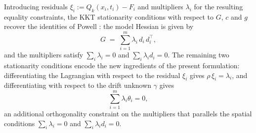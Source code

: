 \documentclass[11pt,a4paper]{article}
\begin{document}
Introducing residuals $\xi_i := Q_k(x_i, t_i) - F_i$ and multipliers
$\lambda_i$ for the resulting equality constraints, the KKT
stationarity conditions with respect to $G$, $c$ and $g$ recover the
identities of Powell \cite{Powell2004LeastFrobenius}: the model
Hessian is given by
\begin{equation}\label{eq:stat-G}
  G \;=\; \sum_{i=1}^m \lambda_i\,d_i\,d_i^{\!\top},
\end{equation}
and the multipliers satisfy $\sum_i \lambda_i = 0$ and
$\sum_i \lambda_i d_i = 0$. The remaining two stationarity conditions
encode the new ingredients of the present formulation: differentiating
the Lagrangian with respect to the residual $\xi_i$ gives
$\rho\,\xi_i = \lambda_i$, and differentiating with respect to the
drift unknown $\gamma$ gives
\begin{equation}\label{eq:stat-gamma}
  \sum_{i=1}^{m} \lambda_i \theta_i = 0,
\end{equation}
an additional orthogonality constraint on the multipliers that
parallels the spatial conditions $\sum_i \lambda_i = 0$ and
$\sum_i \lambda_i d_i = 0$.
\end{document}

